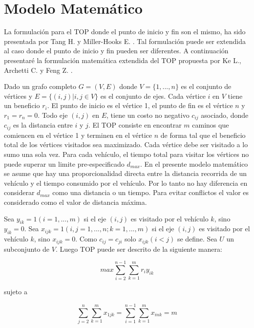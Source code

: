 \chapter{Modelo Matemático}

La formulación para el TOP donde el punto de inicio y fin son el mismo, ha sido presentada por Tang H. y Miller-Hooks E. \cite{TangMillerHooks}. Tal formulación puede ser extendida al caso donde el punto de inicio y fin pueden ser diferentes. A continuación presentaré la formulación matemática extendida del TOP propuesta por Ke L., Archetti C. y Feng Z. \cite{KeArchettiFeng}.

\bigskip

Dado un grafo completo $G=(V,E)$ donde $V=\{1,...,n\}$ es el conjunto de vértices y $E=\{(i,j)|i,j \in V\}$ es el conjunto de ejes. Cada vértice $i$ en $V$ tiene un beneficio $r_i$. El punto de inicio es el vértice 1, el punto de fin es el vértice $n$ y $r_1=r_n=0$. Todo eje $(i,j)$ en $E$, tiene un costo no negativo $c_{ij}$ asociado, donde $c_{ij}$ es la distancia entre $i$ y $j$. El TOP consiste en encontrar $m$ caminos que comiencen en el vértice 1 y terminen en el vértice $n$ de forma tal que el beneficio total de los vértices visitados sea maximizado. Cada vértice debe ser visitado a lo sumo una sola vez. Para cada vehículo, el tiempo total para visitar los vértices no puede superar un limite pre-especificado $d_{max}$. En el presente modelo matemático se asume que hay una proporcionalidad directa entre la distancia recorrida de un vehículo y el tiempo consumido por el vehículo. Por lo tanto no hay diferencia en considerar $d_{max}$ como una distancia o un tiempo. Para evitar conflictos el valor es considerado como el valor de distancia máxima.

\bigskip

Sea $y_{ik} = 1 (i = 1,...,m)$ si el eje $(i,j)$ es visitado por el vehículo $k$, sino $y_{ik} = 0$. Sea $x_{ijk} = 1 (i,j = 1,...,n; k=1,...,m)$ si el eje $(i,j)$ es visitado por el vehículo $k$, sino $x_{ijk} = 0$. Como $c_{ij}=c_{ji}$ solo $x_{ijk}(i<j)$ se define. Sea $U$ un subconjunto de $V$. Luego TOP puede ser descrito de la siguiente manera:

\bigskip

\begin{equation}
max \sum_{i=2}^{n-1} \sum_{k=1}^{m} r_i y_{ik}
\end{equation}

sujeto a

\begin{equation} \label{eq:modelo2}
\sum_{j=2}^{n} \sum_{k=1}^{m} x_{1jk} = \sum_{i=1}^{n-1} \sum_{k=1}^{m} x_{ink} = m
\end{equation}

